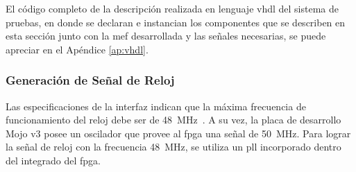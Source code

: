 %		
%
%
%
El código completo de la descripción realizada en lenguaje \acrshort{vhdl} del sistema de pruebas, en donde se declaran e instancian los componentes que se describen en esta sección junto con la \acrshort{mef} desarrollada y las señales necesarias, se puede apreciar en el Apéndice \ref{ap:vhdl}.

	\subsubsection{Generación de Señal de Reloj}
		Las especificaciones de la interfaz indican que la máxima frecuencia de funcionamiento del reloj debe ser de \SI{48}{\mega\hertz}~\cite{Cypress2017}. A su vez, la placa de desarrollo Mojo v3 posee un oscilador que provee al \acrshort{fpga} una señal de \SI{50}{\mega\hertz}. Para lograr la señal de reloj con la frecuencia \SI{48}{\mega\hertz}, se utiliza un \acrshort{pll} incorporado dentro del integrado del \acrshort{fpga}. 
		

